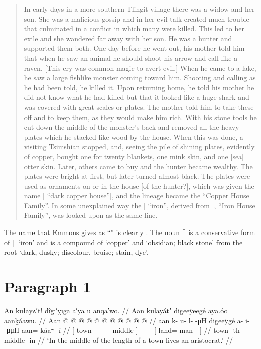 \begin{quote}
In early days in a more southern Tlingit village there was a widow and her son.
She was a malicious gossip and in her evil talk created much trouble that culminated in a conflict in which many were killed.
This led to her exile and she wandered far away with her son.
He was a hunter and supported them both.
One day before he went out, his mother told him that when he saw an animal he should shoot his arrow and call like a raven.
[This cry was common magic to avert evil.]
When he came to a lake, he saw a large fishlike monster coming toward him.
Shooting and calling as he had been told, he killed it.
Upon returning home, he told his mother he did not know what he had killed but that it looked like a huge shark and was covered with great scales or plates.
The mother told him to take these off and to keep them, as they would make him rich.
With his stone tools he cut down the middle of the monster’s back and removed all the heavy plates which he stacked like wood by the house.
When this was done, a visiting Tsimshian stopped, and, seeing the pile of shining plates, evidently of copper, bought one for twenty blankets, one mink skin, and one [sea] otter skin.
Later, others came to buy and the hunter became wealthy.
The plates were bright at first, but later turned almost black.
The plates were used as ornaments on or in the house [of the hunter?], which was given the name  [ “dark copper house”], and the lineage became the  “Copper House Family”.
In some unexplained way the  [ “iron”, derived from ], “Iron House Family”, was looked upon as the same line.
\end{quote}

The name that Emmons gives as “” is clearly .
The noun  [] is a conservative form of  [] ‘iron’ and is a compound of  ‘copper’ and  ‘obsidian; black stone’ from the root  ‘dark, dusky; discolour, bruise; stain, dye’.

\clearpage
\section{Paragraph 1}\label{sec:89-para-1}

\ex\label{ex:89-1-long-town-chief}%
%
\begingl
	\glpreamble	An kułayᴀ′t! dîgī′ỵīga a′ya u ānqā′wo. //
	\glpreamble	Aan kulayátʼ digeeÿeegé aya.óo aanḵáawu. //
	\gla	{} Aan  @ {} @ {} @ {} @ {} @ {}  @ {} {}
		 @ {} @ {} @ {}
		{}  @ {} @ {} {} //
	\glb	{} aan k- u- l-  -μH {} digeeÿgé {} {}
		a- i-  -μμH
		{} aan= ḵáaʷ -í {} //
	\glc	{}[ town - - -  - \· middle \· {}]
		- -  -
		{}[ land= man - {}] //
	\gld	{} town  {} {} {} {} -th middle -in {}
		 {} {} {}
		{}  {} {} {} //
	\glft	‘In the middle of the length of a town lives an aristocrat.’
		//
\endgl
\xe

